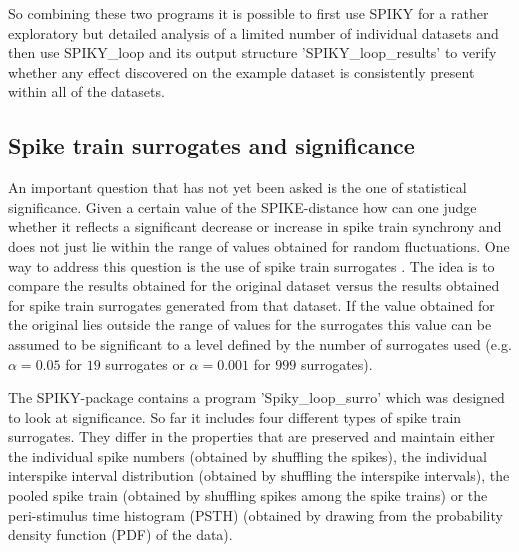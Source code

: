 \documentclass[10pt,twocolumn]{elsart5p}
\begin{document}
So combining these two programs it is possible to first use SPIKY for a rather exploratory but detailed analysis of a limited number of individual datasets and then use SPIKY\_loop and its output structure 'SPIKY\_loop\_results' to verify whether any effect discovered on the example dataset is consistently present within all of the datasets.


\subsection{\label{ss:Spike-train-surrogates} Spike train surrogates and significance}

An important question that has not yet been asked is the one of statistical significance. Given a certain value of the SPIKE-distance how can one judge whether it reflects a significant decrease or increase in spike train synchrony and does not just lie within the range of values obtained for random fluctuations. One way to address this question is the use of spike train surrogates \citep{Kass05, Gruen09, Louis10}. The idea is to compare the results obtained for the original dataset versus the results obtained for spike train surrogates generated from that dataset. If the value obtained for the original lies outside the range of values for the surrogates this value can be assumed to be significant to a level defined by the number of surrogates used (e.g. $\alpha = 0.05$ for $19$ surrogates or $\alpha = 0.001$ for $999$ surrogates).

The SPIKY-package contains a program 'Spiky\_loop\_surro' which was designed to look at significance.
So far it includes four different types of spike train surrogates. They differ in the properties that are preserved and maintain either the individual spike numbers (obtained by shuffling the spikes), the individual interspike interval distribution (obtained by shuffling the interspike intervals), the pooled spike train (obtained by shuffling spikes among the spike trains) or the peri-stimulus time histogram (PSTH) (obtained by drawing from the probability density function (PDF) of the data).


%
\end{document}
